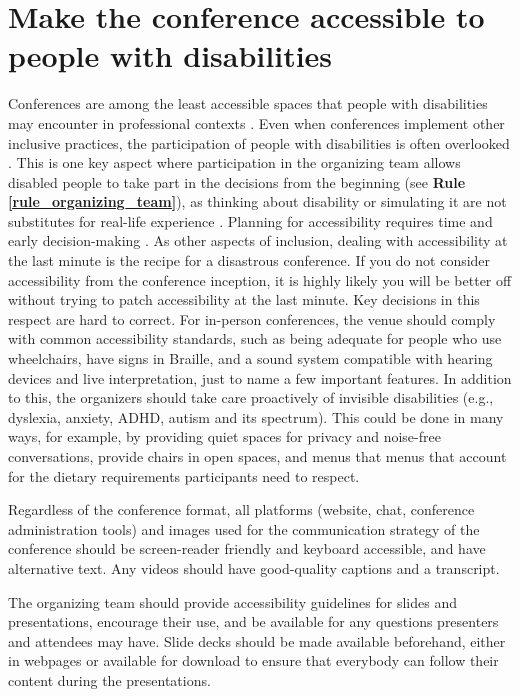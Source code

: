 \documentclass[10pt,letterpaper]{article}
\begin{document}
\section{Make the conference accessible to people with disabilities}
\label{rule_accessibility}


Conferences are among the least accessible spaces that people with disabilities may encounter in professional contexts \cite{priceAccessImaginedConstruction2009}. Even when conferences implement other inclusive practices, the participation of people with disabilities is often overlooked \cite{marks2021meeting}. This is one key aspect where participation in the organizing team allows disabled people to take part in the decisions from the beginning (see \textbf{Rule \ref{rule_organizing_team}}), as thinking about disability or simulating it are not substitutes for real-life experience \cite{costanzachockDesign2020}. Planning for accessibility requires time and early decision-making \cite{irishIncreasingParticipationUsing2020}. As other aspects of inclusion, dealing with accessibility at the last minute is the recipe for a disastrous conference. If you do not consider accessibility from the conference inception, it is highly likely you will be better off without trying to patch accessibility at the last minute. Key decisions in this respect are hard to correct. 
For in-person conferences, the venue should comply with common accessibility standards, such as being adequate for people who use wheelchairs, have signs in Braille, and a sound system compatible with hearing devices and live interpretation, just to name a few important features. In addition to this, the organizers should take care proactively of invisible disabilities (e.g., dyslexia, anxiety, ADHD, autism and its spectrum). This could be done in many ways, for example, by providing quiet spaces for privacy and noise-free conversations, provide chairs in open spaces, and menus that menus that account for the dietary requirements participants need to respect.%

Regardless of the conference format, all platforms (website, chat, conference administration tools) and images used for the communication strategy of the conference should be screen-reader friendly and keyboard accessible, and have alternative text. Any videos should have good-quality captions and a transcript.

The organizing team should provide accessibility guidelines for slides and presentations, encourage their use, and be available for any questions presenters and attendees may have. Slide decks should be made available beforehand, either in webpages or available for download to ensure that everybody can follow their content during the presentations. 
\end{document}
